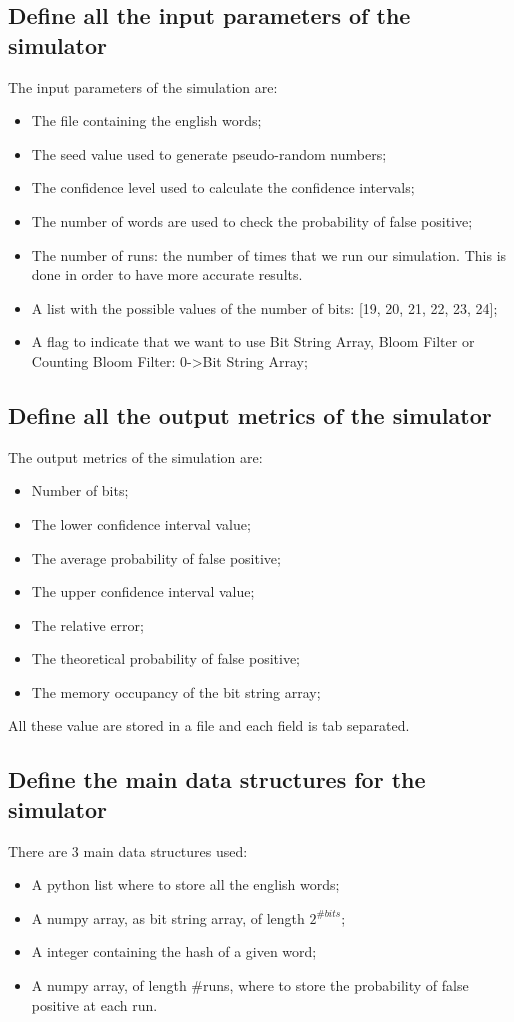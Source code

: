 \documentclass{report}
\begin{document}
				\subsection{Define all the input parameters of the simulator}
					The input parameters of the simulation are:
					\begin{itemize}
						\item The file containing the english words;
						\item The seed value used to generate pseudo-random numbers;
						\item The confidence level used to calculate the confidence intervals;
						\item The number of words are used to check the probability of false positive;
						\item The number of runs: the number of times that we run our simulation. This is done in order to have more accurate results.
						\item A list with the possible values of the number of bits: [19, 20, 21, 22, 23, 24];
						\item A flag to indicate that we want to use Bit String Array, Bloom Filter or Counting Bloom Filter: 0->Bit String Array;
					\end{itemize}
					 
				\subsection{Define all the output metrics of the simulator}
				The output metrics of the simulation are:
				\begin{itemize}
					\item Number of bits;
					\item The lower confidence interval value;
					\item The average probability of false positive;
					\item The upper confidence interval value;
					\item The relative error;
					\item The theoretical probability of false positive;
					\item The memory occupancy of the bit string array;
				\end{itemize}
				All these value are stored in a file and each field is tab separated.
			
			\subsection{Define the main data structures for the simulator}
						There are 3 main data structures used: 
							\begin{itemize}
								\item A python list where to store all the english words;
								\item A numpy array, as bit string array, of length $2^{\#bits}$;
								\item A integer containing the hash of a given word;
								\item A numpy array, of length \#runs, where to store the probability of false positive at each run.
							\end{itemize}
					
\end{document}
